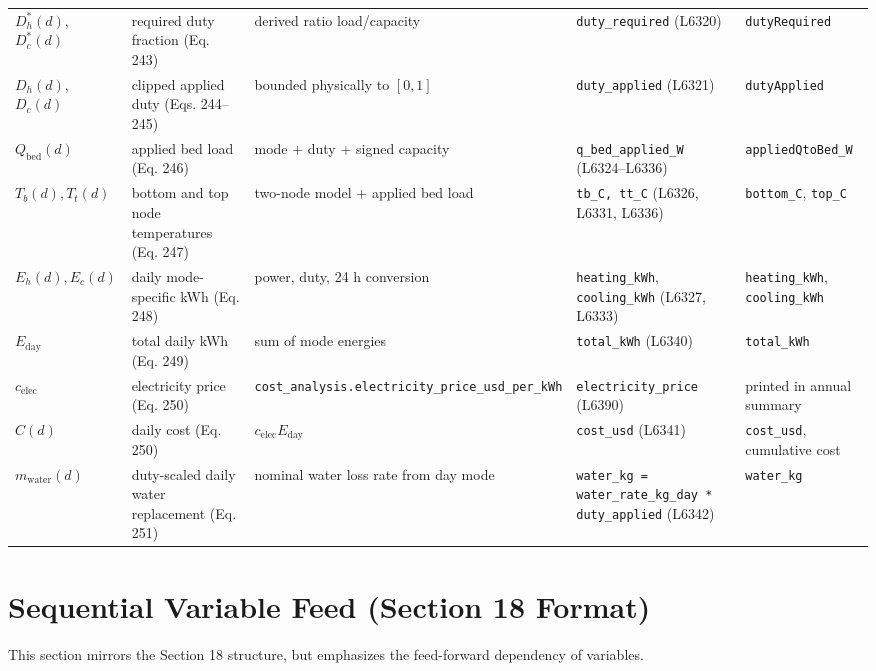 \documentclass[11pt]{article}
\begin{document}
\begin{longtable}{p{}p{}p{}p{}p{}}
$D_h^*(d)$, $D_c^*(d)$ & required duty fraction (Eq. 243) & derived ratio load/capacity & \texttt{duty\_required} (L6320) & \texttt{dutyRequired} \\

$D_h(d)$, $D_c(d)$ & clipped applied duty (Eqs. 244--245) & bounded physically to $[0,1]$ & \texttt{duty\_applied} (L6321) & \texttt{dutyApplied} \\

$Q_{\mathrm{bed}}(d)$ & applied bed load (Eq. 246) & mode + duty + signed capacity & \texttt{q\_bed\_applied\_W} (L6324--L6336) & \texttt{appliedQtoBed\_W} \\

$T_b(d), T_t(d)$ & bottom and top node temperatures (Eq. 247) & two-node model + applied bed load & \texttt{tb\_C, tt\_C} (L6326, L6331, L6336) & \texttt{bottom\_C}, \texttt{top\_C} \\

$E_h(d), E_c(d)$ & daily mode-specific kWh (Eq. 248) & power, duty, 24 h conversion & \texttt{heating\_kWh}, \texttt{cooling\_kWh} (L6327, L6333) & \texttt{heating\_kWh}, \texttt{cooling\_kWh} \\

$E_{\mathrm{day}}$ & total daily kWh (Eq. 249) & sum of mode energies & \texttt{total\_kWh} (L6340) & \texttt{total\_kWh} \\

$c_{\mathrm{elec}}$ & electricity price (Eq. 250) & \texttt{cost\_analysis.electricity\_price\_usd\_per\_kWh} & \texttt{electricity\_price} (L6390) & printed in annual summary \\

$C(d)$ & daily cost (Eq. 250) & $c_{\mathrm{elec}} E_{\mathrm{day}}$ & \texttt{cost\_usd} (L6341) & \texttt{cost\_usd}, cumulative cost \\

$m_{\mathrm{water}}(d)$ & duty-scaled daily water replacement (Eq. 251) & nominal water loss rate from day mode & \texttt{water\_kg = water\_rate\_kg\_day * duty\_applied} (L6342) & \texttt{water\_kg} \\

\bottomrule
\end{longtable}
\normalsize

\section{Sequential Variable Feed (Section 18 Format)}
This section mirrors the Section 18 structure, but emphasizes the feed-forward dependency of variables.
\end{document}
